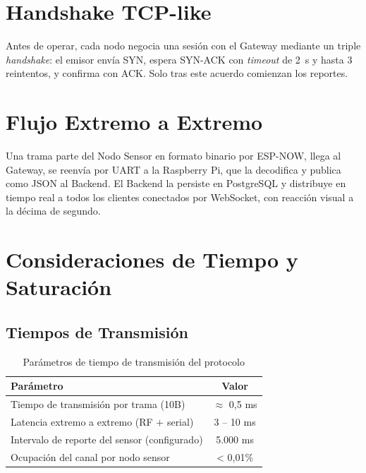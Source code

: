 \section{Handshake TCP-like}

Antes de operar, cada nodo negocia una sesión con el Gateway mediante un triple
\textit{handshake}: el emisor envía SYN, espera SYN-ACK con \textit{timeout} de 2~s
y hasta 3 reintentos, y confirma con ACK. Solo tras este acuerdo comienzan los reportes.

\section{Flujo Extremo a Extremo}

Una trama parte del Nodo Sensor en formato binario por ESP-NOW, llega al Gateway,
se reenvía por UART a la Raspberry Pi, que la decodifica y publica como JSON al Backend.
El Backend la persiste en PostgreSQL y distribuye en tiempo real a todos los clientes
conectados por WebSocket, con reacción visual a la décima de segundo.

\section{Consideraciones de Tiempo y Saturación}

\subsection{Tiempos de Transmisión}

\begin{table}[H]
    \centering
    \caption{Parámetros de tiempo de transmisión del protocolo}
    \begin{tabular}{lc}
        \toprule
        \textbf{Parámetro} & \textbf{Valor} \\
        \midrule
        Tiempo de transmisión por trama (10B) & $\approx$ 0,5 ms \\
        Latencia extremo a extremo (RF + serial) & 3 -- 10 ms \\
        Intervalo de reporte del sensor (configurado) & 5.000 ms \\
        Ocupación del canal por nodo sensor & < 0,01\% \\
        \bottomrule
    \end{tabular}
    \label{tab:tiempos}
\end{table}


